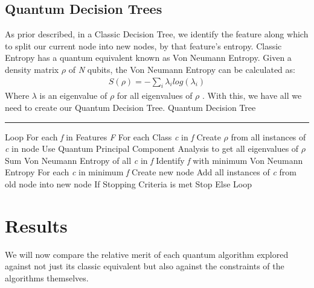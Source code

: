 \documentclass[conference]{IEEEtran}
\begin{document}
\subsection{Quantum Decision Trees}
As prior described, in a Classic Decision Tree, we identify the feature along which to split our current node into new nodes, by that feature's entropy. Classic Entropy has a quantum equivalent known as Von Neumann Entropy. Given a density matrix $\rho$ of \emph{N} qubits, the Von Neumann Entropy can be calculated as:
\begin{align*}
    S(\rho) = -\sum_i \lambda_i log(\lambda_i)
\end{align*}
Where $\lambda$ is an eigenvalue of $\rho$ for all eigenvalues of $\rho$ \cite{b9}. With this, we have all we need to create our Quantum Decision Tree. \newline \newline
{\large Quantum Decision Tree} \newline
\noindent\rule{\columnwidth}{1pt}
Loop \newline
\indent For each \emph{f} in Features \emph{F} \newline
\indent \indent For each Class \emph{c} in \emph{f} \newline
\indent \indent \indent Create $\rho$ from all instances of \emph{c} in node \newline
\indent \indent \indent Use Quantum Principal Component Analysis to get \indent \indent \indent all eigenvalues of $\rho$ \newline
\indent \indent Sum Von Neumann Entropy of all \emph{c} in \emph{f} \newline
\indent Identify \emph{f} with minimum Von Neumann Entropy \newline
\indent \indent For each \emph{c} in minimum \emph{f} \newline
\indent \indent \indent Create new node \newline
\indent \indent \indent Add all instances of \emph{c} from old node into new node \newline
\indent If Stopping Criteria is met \newline
\indent \indent Stop \newline
\indent Else \newline
\indent \indent Loop \newline
\section{Results}
We will now compare the relative merit of each quantum algorithm explored against not just its classic equivalent but also against the constraints of the algorithms themselves.
\end{document}
